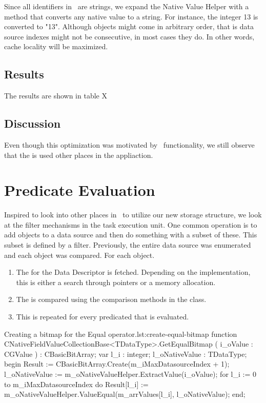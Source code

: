 Since all identifiers in \gap~are strings, we expand the Native Value Helper with a  method that converts any native value to a string. For instance, the integer 13 is converted to "13". Although objects might come in arbitrary order, that is data source indexes might not be consecutive, in most cases they do. In other words, cache locality will be maximized.

\subsection{Results}
\label{sub:Results}
The results are shown in table X

\subsection{Discussion}
\label{sub:Discussion}
Even though this optimization was motivated by \bd~functionality, we still observe that the  is used other places in the appliaction.

\section{Predicate Evaluation}
\label{sec:Predicate Evaluation}
Inspired to look into other places in \gap~to utilize our new storage structure, we look at the filter mechanisms in the task execution unit. One common operation is to add objects to a data source and then do something with a subset of these. This subset is defined by a filter. Previously, the entire data source was enumerated and each object was compared. For each object.
\begin{enumerate}
    \item The  for the Data Descriptor is fetched. Depending on the implementation, this is either a search through pointers or a memory allocation.
    \item The  is compared using the comparison methods in the class.
    \item This is repeated for every predicated that is evaluated. 
\end{enumerate}

\begin{delphicode}{Creating a bitmap for the Equal operator.}{lst:create-equal-bitmap}
function CNativeFieldValueCollectionBase<TDataType>.GetEqualBitmap
( i_oValue : CGValue )
: CBasicBitArray;
var
  l_i : integer;
  l_oNativeValue : TDataType;
begin
  Result := CBasicBitArray.Create(m_iMaxDatasourceIndex + 1);
  l_oNativeValue := m_oNativeValueHelper.ExtractValue(i_oValue);
  for l_i := 0 to m_iMaxDatasourceIndex do
    Result[l_i] := m_oNativeValueHelper.ValueEqual(m_arrValues[l_i], l_oNativeValue);
end;
\end{delphicode}

